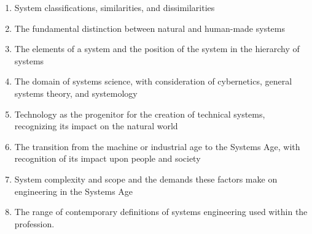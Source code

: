 \begin{enumerate}
\item System classifications, similarities, and dissimilarities
\item The fundamental distinction between natural and human-made systems
\item The elements of a system and the position of the system in the hierarchy of systems
\item The domain of systems science, with consideration of cybernetics, general systems theory, and systemology
\item Technology as the progenitor for the creation of technical systems, recognizing its impact on the natural world
\item The transition from the machine or industrial age to the Systems Age, with recognition of its impact upon people and society
\item System complexity and scope and the demands these factors make on engineering in the Systems Age
\item The range of contemporary definitions of systems engineering used within the profession.
\end{enumerate}


